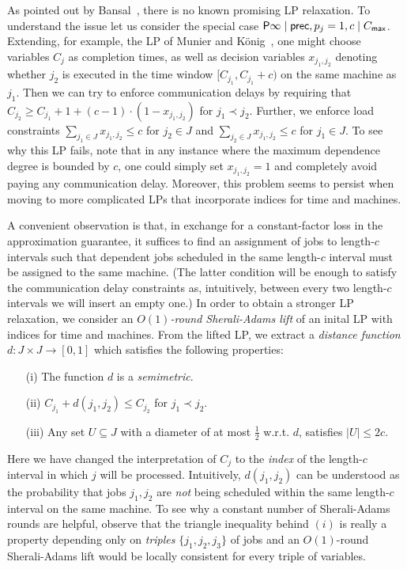 As pointed out by Bansal~\cite{Bansalmapsp}, there is no known promising LP relaxation. To understand the issue
let us consider the special case $\mathsf{P} \infty \mid \mathsf{prec}, p_j=1, c \mid C_{\mathsf{max}}$. Extending, for example, the LP of Munier and K\"onig~\cite{MunierKonig}, one might choose
variables $C_j$ as completion times, as well as decision variables $x_{j_1,j_2}$ denoting whether $j_2$ is executed in the time window $[C_{j_1},C_{j_1}+c)$ on the same machine as $j_1$. Then we can try to enforce communication delays by requiring that $C_{j_2} \geq C_{j_1} + 1 + (c-1) \cdot (1-x_{j_1,j_2})$ for $j_1 \prec j_2$. Further, we enforce load constraints $\sum_{j_1 \in J} x_{j_1,j_2} \leq c$ for $j_2 \in J$ and $\sum_{j_2 \in J} x_{j_1,j_2} \leq c$ for $j_1 \in J$. To see why this LP fails, note that in any instance where the maximum dependence degree is bounded by $c$, one could simply set $x_{j_1,j_2} = 1$ and completely avoid paying any communication delay.
Moreover, this problem seems to persist when moving to more complicated LPs that incorporate indices for time and machines.

A convenient observation is that, in exchange for a constant-factor loss in the approximation guarantee, it suffices to
find an assignment of jobs to length-$c$ intervals such that dependent jobs scheduled in the same length-$c$ interval must be
assigned to the same machine.
(The latter condition will be enough to satisfy the communication delay constraints
as, intuitively, between every two length-$c$ intervals we will insert an empty one.)
In order to obtain a stronger LP relaxation, we consider an \emph{$O(1)$-round Sherali-Adams lift} of an inital LP with indices for time and machines. %
From the lifted LP, we extract a \emph{distance function} $d: J \times J \to [0,1]$ which satisfies the following properties: 
\begin{enumerate}
\item[(i)] The function $d$ is a \emph{semimetric}.
\item[(ii)] $C_{j_1} +  d(j_1,j_2) \leq C_{j_2}$ for $j_1 \prec j_2$.
\item[(iii)] Any set $U \subseteq J$ with a diameter of at most $\frac{1}{2}$ w.r.t. $d$, satisfies $|U| \leq 2c$.
\end{enumerate}
Here we have changed the interpretation of $C_j$ to the \emph{index} of the length-$c$ interval in which $j$ will be processed.
Intuitively, $d(j_1,j_2)$ can be understood as the probability that jobs $j_1,j_2$ are \emph{not} being scheduled within the same length-$c$ interval on the same machine. To see why a constant number of Sherali-Adams rounds are helpful, observe that the triangle inequality behind $(i)$ is really a property depending only on \emph{triples} $\{ j_1,j_2,j_3\}$ of jobs and an $O(1)$-round Sherali-Adams lift
would be locally consistent for every triple of variables.

